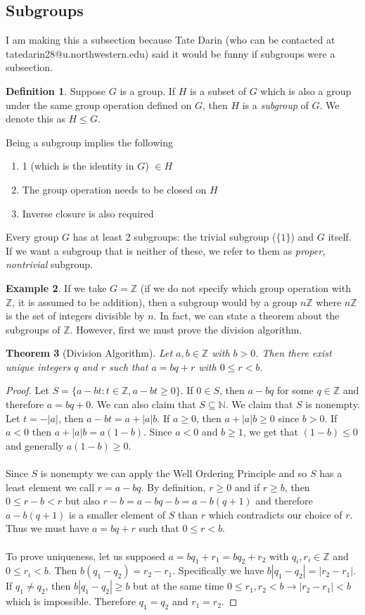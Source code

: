 \documentclass{article}
\newcommand{\Z}{\mathbb{Z}}
\newcommand{\N}{\mathbb{N}}
\newtheorem{theorem}{Theorem}[section]
\theoremstyle{definition}
\newtheorem{definition}[theorem]{Definition}
\newtheorem{example}[theorem]{Example}
\begin{document}
\subsection{Subgroups}
I am making this a subsection because Tate Darin (who can be contacted at tatedarin28@u.northwestern.edu) said it would be funny if subgroups were a subsection.
\begin{definition}
    Suppose $G$ is a group. If $H$ is a subset of $G$ which is also a group under the same group operation defined on $G$, then $H$ is a \emph{subgroup} of $G$. We denote this as $H\leq G$.
\end{definition}
Being a subgroup implies the following 
\begin{enumerate}
    \item 1 (which is the identity in $G$) $\in H$
    \item The group operation needs to be closed on $H$ 
    \item Inverse closure is also required
\end{enumerate}
Every group $G$ has at least 2 subgroups: the trivial subgroup ($\{ 1\}$) and $G$ itself. If we want a subgroup that is neither of these, we refer to them as \emph{proper, nontrivial} subgroup. 
\begin{example}
    If we take $G=\Z$ (if we do not specify which group operation with $\Z$, it is assumed to be addition), then a subgroup would by a group $n\Z$ where $n\Z$ is the set of integers divisible by $n$. In fact, we can state a theorem about the subgroups of $\Z$. However, first we must prove the division algorithm.
\end{example}
\begin{theorem}[Division Algorithm]
    Let $a,b \in \Z$ with $b>0$. Then there exist unique integers $q$ and $r$ such that $a=bq+r$ with $0\leq r<b$.
\end{theorem}
\begin{proof}
    Let $S=\{a-bt: t\in \Z, a-bt \geq 0\}$. If $0\in S$, then $a-bq$ for some $q\in \Z$ and therefore $a=bq+0$. We can also claim that $S\subseteq \N$. We claim that $S$ is nonempty. Let $t=-|a|$, then $a-bt = a+|a|b$. If $a\geq 0$, then $a+|a|b \geq 0$ since $b>0$. If $a<0$ then $a+|a|b=a(1-b)$. Since $a<0$ and $b\geq 1$, we get that $(1-b)\leq 0$ and generally $a(1-b)\geq 0$.\\\\
    Since $S$ is nonempty we can apply the Well Ordering Principle and so $S$ has a least element we call $r=a-bq$. By definition, $r\geq 0$ and if $r\geq b$, then $0\leq r-b<r$ but also $r-b=a-bq-b=a-b(q+1)$ and therefore $a-b(q+1)$ is a smaller element of $S$ than $r$ which contradicts our choice of $r$. Thus we must have $a=bq+r$ such that $0\leq r<b$.\\\\
    To prove uniqueness, let us supposed $a=bq_1+r_1=bq_2+r_2$ with $q_i,r_i\in \Z$ and $0\leq r_i<b$. Then $b(q_1-q_2)=r_2-r_1$. Specifically we have $b|q_1-q_2|=|r_2-r_1|$. If $q_1\neq q_2$, then $b|q_1-q_2|\geq b$ but at the same time $0\leq r_1,r_2<b\rightarrow |r_2-r_1|<b$ which is impossible. Therefore $q_1=q_2$ and $r_1=r_2$.
\end{proof}
\end{document}
